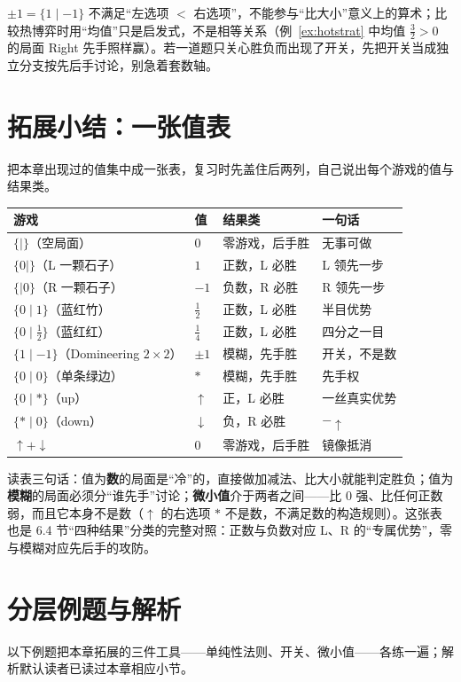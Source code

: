 \documentclass[UTF8,a4paper,11pt,oneside,openany,fontset=fandol]{ctexbook}
\theoremstyle{definition}
\begin{document}
\begin{pitfall}[开关不是数]
$\pm1=\{1\mid -1\}$ 不满足“左选项 $<$ 右选项”，不能参与“比大小”意义上的算术；比较热博弈时用“均值”只是启发式，不是相等关系（例~\ref{ex:hotstrat} 中均值 $\tfrac32>0$ 的局面 Right 先手照样赢）。若一道题只关心胜负而出现了开关，先把开关当成独立分支按先后手讨论，别急着套数轴。
\end{pitfall}

\section{拓展小结：一张值表}
把本章出现过的值集中成一张表，复习时先盖住后两列，自己说出每个游戏的值与结果类。

\begin{center}
\begin{tabular}{llll}
\toprule
游戏 & 值 & 结果类 & 一句话\\
\midrule
$\{\mid\}$（空局面） & $0$ & 零游戏，后手胜 & 无事可做\\
$\{0\mid\}$（L 一颗石子） & $1$ & 正数，L 必胜 & L 领先一步\\
$\{\mid 0\}$（R 一颗石子） & $-1$ & 负数，R 必胜 & R 领先一步\\
$\{0\mid 1\}$（蓝红竹） & $\tfrac12$ & 正数，L 必胜 & 半目优势\\
$\{0\mid \tfrac12\}$（蓝红红） & $\tfrac14$ & 正数，L 必胜 & 四分之一目\\
$\{1\mid -1\}$（Domineering $2\times2$） & $\pm1$ & 模糊，先手胜 & 开关，不是数\\
$\{0\mid 0\}$（单条绿边） & $\ast$ & 模糊，先手胜 & 先手权\\
$\{0\mid \ast\}$（up） & $\uparrow$ & 正，L 必胜 & 一丝真实优势\\
$\{\ast\mid 0\}$（down） & $\downarrow$ & 负，R 必胜 & $-\uparrow$\\
$\uparrow+\downarrow$ & $0$ & 零游戏，后手胜 & 镜像抵消\\
\bottomrule
\end{tabular}
\end{center}

读表三句话：值为\textbf{数}的局面是“冷”的，直接做加减法、比大小就能判定胜负；值为\textbf{模糊}的局面必须分“谁先手”讨论；\textbf{微小值}介于两者之间——比 $0$ 强、比任何正数弱，而且它本身不是数（$\uparrow$ 的右选项 $\ast$ 不是数，不满足数的构造规则）。这张表也是 6.4 节“四种结果”分类的完整对照：正数与负数对应 L、R 的“专属优势”，零与模糊对应先后手的攻防。

\section{分层例题与解析}
以下例题把本章拓展的三件工具——单纯性法则、开关、微小值——各练一遍；解析默认读者已读过本章相应小节。
\end{document}
